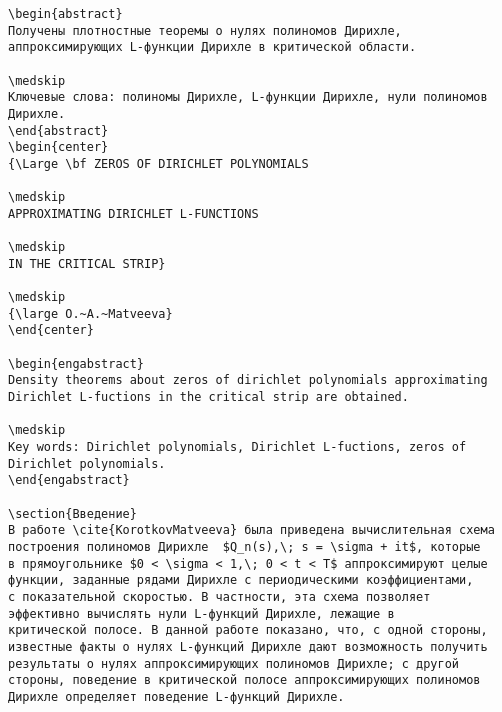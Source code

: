 \newpage
\begin{verbatim}
\begin{abstract}
Получены плотностные теоремы о нулях полиномов Дирихле,
аппроксимирующих L-функции Дирихле в критической области.

\medskip
Ключевые слова: полиномы Дирихле, L-функции Дирихле, нули полиномов
Дирихле.
\end{abstract}
\begin{center}
{\Large \bf ZEROS OF DIRICHLET POLYNOMIALS

\medskip
APPROXIMATING DIRICHLET L-FUNCTIONS

\medskip
IN THE CRITICAL STRIP}

\medskip
{\large O.~A.~Matveeva}
\end{center}

\begin{engabstract}
Density theorems about zeros of dirichlet polynomials approximating
Dirichlet L-fuctions in the critical strip are obtained.

\medskip
Key words: Dirichlet polynomials, Dirichlet L-fuctions, zeros of
Dirichlet polynomials.
\end{engabstract}

\section{Введение}
В работе \cite{KorotkovMatveeva} была приведена вычислительная схема
построения полиномов Дирихле  $Q_n(s),\; s = \sigma + it$, которые
в прямоугольнике $0 < \sigma < 1,\; 0 < t < T$ аппроксимируют целые
функции, заданные рядами Дирихле с периодическими коэффициентами,
с показательной скоростью. В частности, эта схема позволяет
эффективно вычислять нули L-функций Дирихле, лежащие в
критической полосе. В данной работе показано, что, с одной стороны,
известные факты о нулях L-функций Дирихле дают возможность получить
результаты о нулях аппроксимирующих полиномов Дирихле; с другой
стороны, поведение в критической полосе аппроксимирующих полиномов
Дирихле определяет поведение L-функций Дирихле.
\end{verbatim}

